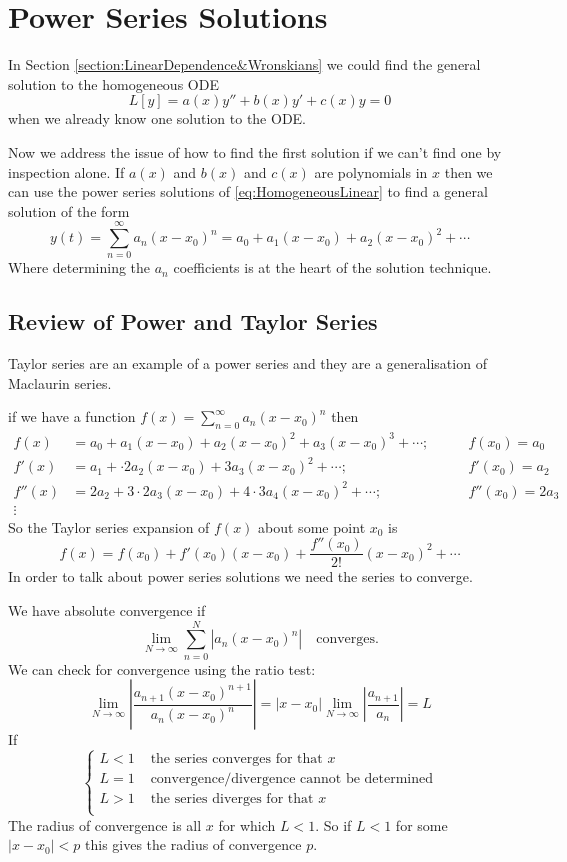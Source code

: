 \documentclass{article}
\theoremstyle{plain}
\theoremstyle{definition}
\numberwithin{equation}{section}
\begin{document}
\pagebreak

\section{Power Series Solutions}

In Section \ref{section:LinearDependence&Wronskians} we could find the general solution to the homogeneous ODE
\begin{equation}\label{eq:HomogeneousLinear}
    L[y] = a(x)y'' + b(x)y' + c(x)y = 0
\end{equation}
when we already know one solution to the ODE.

Now we address the issue of how to find the first solution if we can't find one by inspection alone. If $a(x)$ and $b(x)$ and $c(x)$ are polynomials in $x$ then we can use the power series solutions of \eqref{eq:HomogeneousLinear} to find a general solution of the form
\[
    y(t) = \sum_{n=0}^{\infty}a_n (x-x_0)^n = a_0 + a_1(x-x_0) + a_2(x-x_0)^2 + \cdots
\]
Where determining the $a_n$ coefficients is at the heart of the solution technique.

\subsection{Review of Power and Taylor Series}

Taylor series are an example of a power series and they are a generalisation of Maclaurin series.

if we have a function $f(x) = \sum_{n=0}^{\infty} a_n(x-x_0)^n$ then
\begin{align*}
    f(x) &= a_0 + a_1(x-x_0) + a_2(x-x_0)^2 + a_3(x-x_0)^3 + \cdots; &\qquad f(x_0) = a_0 \\
    f'(x) &= a_1 + \cdot2 a_2(x-x_0) + 3 a_3(x-x_0)^2 + \cdots; &\qquad f'(x_0) = a_2 \\
    f''(x) &= 2a_2 + 3\cdot2 a_3(x-x_0) + 4\cdot3 a_4(x-x_0)^2 + \cdots; &\qquad f''(x_0) = 2a_3 \\
    \vdots
\end{align*}
So the Taylor series expansion of $f(x)$ about some point $x_0$ is $$f(x)=f(x_0) + f'(x_0)(x-x_0) + \frac{f''(x_0)}{2!} (x-x_0)^2 + \cdots$$
In order to talk about power series solutions we need the series to converge.

We have absolute convergence if
\[
\lim_{N\to \infty} \sum_{n=0}^{N} \left\vert a_n(x-x_0)^n \right\vert \quad \text{converges.}
\]
We can check for convergence using the ratio test:
\[
\lim_{N\to \infty} \left\vert \frac{a_{n+1} (x-x_0)^{n+1}}{a_n(x-x_0)^n} \right\vert = \vert x-x_0 \vert \lim_{N\to \infty} \left\vert \frac{a_{n+1}}{a_n} \right\vert = L
\]
If
\[
\begin{cases}
    L < 1 & \text{ the series converges for that $x$} \\
    L = 1 & \text{ convergence/divergence cannot be determined} \\
    L > 1 & \text{ the series diverges for that $x$} \\
\end{cases}
\]
The radius of convergence is all $x$ for which $L<1$. So if $L<1$ for some $\vert x - x_0 \vert < p$ this gives the radius of convergence $p$.
\end{document}
